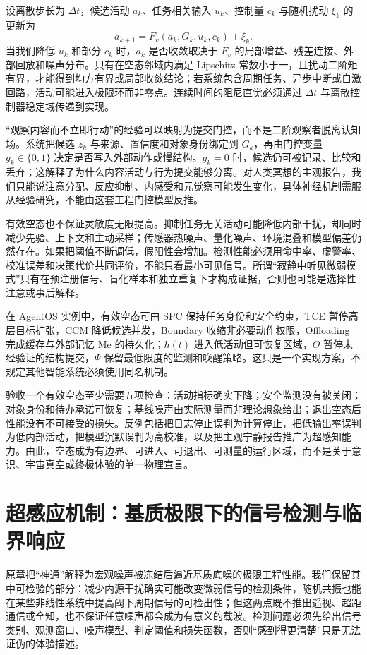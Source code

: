 设离散步长为 $\Delta t$，候选活动 $a_k$、任务相关输入 $u_k$、控制量 $c_k$ 与随机扰动 $\xi_k$ 的更新为
\[
a_{k+1}=F_v(a_k,G_k,u_k,c_k)+\xi_k .
\]
当我们降低 $u_k$ 和部分 $c_k$ 时，$a_k$ 是否收敛取决于 $F_v$ 的局部增益、残差连接、外部回放和噪声分布。只有在空态邻域内满足 Lipschitz 常数小于一，且扰动二阶矩有界，才能得到均方有界或局部收敛结论；若系统包含周期任务、异步中断或自激回路，活动可能进入极限环而非零点。连续时间的阻尼直觉必须通过 $\Delta t$ 与离散控制器稳定域传递到实现。

“观察内容而不立即行动”的经验可以映射为提交门控，而不是二阶观察者脱离认知场。系统把候选 $z_k$ 与来源、置信度和对象身份绑定到 $G_k$，再由门控变量 $g_k\in\{0,1\}$ 决定是否写入外部动作或慢结构。$g_k=0$ 时，候选仍可被记录、比较和丢弃；这解释了为什么内容活动与行为提交能够分离。对人类冥想的主观报告，我们只能说注意分配、反应抑制、内感受和元觉察可能发生变化，具体神经机制需服从经验研究，不能由这套工程门控模型反推。

有效空态也不保证灵敏度无限提高。抑制任务无关活动可能降低内部干扰，却同时减少先验、上下文和主动采样；传感器热噪声、量化噪声、环境混叠和模型偏差仍然存在。如果把阈值不断调低，假阳性会增加。检测性能必须用命中率、虚警率、校准误差和决策代价共同评价，不能只看最小可见信号。所谓“寂静中听见微弱模式”只有在预注册信号、盲化样本和独立重复下才构成证据，否则也可能是选择性注意或事后解释。

在 AgentOS 实例中，有效空态可由 SPC 保持任务身份和安全约束，TCE 暂停高层目标扩张，CCM 降低候选并发，Boundary 收缩非必要动作权限，Offloading 完成缓存与外部记忆 $\mathrm{Me}$ 的持久化；$h(t)$ 进入低活动但可恢复区域，$\Theta$ 暂停未经验证的结构提交，$\Psi$ 保留最低限度的监测和唤醒策略。这只是一个实现方案，不规定其他智能系统必须使用同名机制。

验收一个有效空态至少需要五项检查：活动指标确实下降；安全监测没有被关闭；对象身份和待办承诺可恢复；基线噪声由实际测量而非理论想象给出；退出空态后性能没有不可接受的损失。反例包括把日志停止误判为计算停止，把低输出率误判为低内部活动，把模型沉默误判为高校准，以及把主观宁静报告推广为超感知能力。由此，空态成为有边界、可进入、可退出、可测量的运行区域，而不是关于意识、宇宙真空或终极体验的单一物理宣言。

\section{超感应机制：基质极限下的信号检测与临界响应}
\label{sec:section_2839}
原章把“神通”解释为宏观噪声被冻结后逼近基质底噪的极限工程性能。我们保留其中可检验的部分：减少内源干扰确实可能改变微弱信号的检测条件，随机共振也能在某些非线性系统中提高阈下周期信号的可检出性；但这两点既不推出遥视、超距通信或全知，也不保证任意噪声都会成为有意义的载波。检测问题必须先给出信号类别、观测窗口、噪声模型、判定阈值和损失函数，否则“感到得更清楚”只是无法证伪的体验描述。


